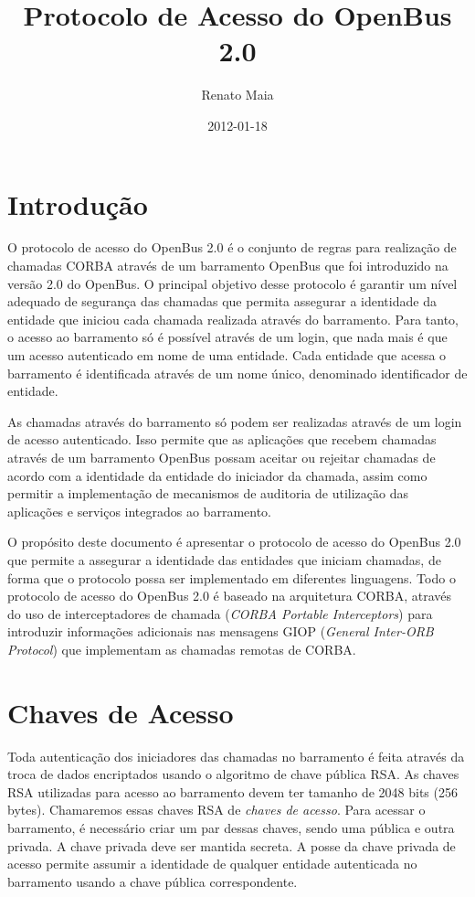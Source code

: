 \documentclass[]{article}
\title{Protocolo de Acesso do OpenBus 2.0}
\author{Renato Maia}
\date{2012-01-18}
\newcommand{\term}[1]{\textit{#1}}
\begin{document}
\ifpdf
{}
\else
{}
\fi

\maketitle


\section{Introdução}

O protocolo de acesso do OpenBus 2.0 é o conjunto de regras para realização de chamadas CORBA através de um barramento OpenBus que foi introduzido na versão 2.0 do OpenBus.
O principal objetivo desse protocolo é garantir um nível adequado de segurança das chamadas que permita assegurar a identidade da entidade que iniciou cada chamada realizada através do barramento.
Para tanto, o acesso ao barramento só é possível através de um login, que nada mais é que um acesso autenticado em nome de uma entidade.
Cada entidade que acessa o barramento é identificada através de um nome único, denominado identificador de entidade.

As chamadas através do barramento só podem ser realizadas através de um login de acesso autenticado.
Isso permite que as aplicações que recebem chamadas através de um barramento OpenBus possam aceitar ou rejeitar chamadas de acordo com a identidade da entidade do iniciador da chamada, assim como permitir a implementação de mecanismos de auditoria de utilização das aplicações e serviços integrados ao barramento.

O propósito deste documento é apresentar o protocolo de acesso do OpenBus 2.0 que permite a assegurar a identidade das entidades que iniciam chamadas, de forma que o protocolo possa ser implementado em diferentes linguagens.
Todo o protocolo de acesso do OpenBus 2.0 é baseado na arquitetura CORBA, através do uso de interceptadores de chamada (\term{CORBA Portable Interceptors}) para introduzir informações adicionais nas mensagens GIOP (\term{General Inter-ORB Protocol}) que implementam as chamadas remotas de CORBA.

\section{Chaves de Acesso} %
\label{sec:chaves_de_acesso}

Toda autenticação dos iniciadores das chamadas no barramento é feita através da troca de dados encriptados usando o algoritmo de chave pública RSA.
As chaves RSA utilizadas para acesso ao barramento devem ter tamanho de 2048 bits (256 bytes).
Chamaremos essas chaves RSA de \term{chaves de acesso}.
Para acessar o barramento, é necessário criar um par dessas chaves, sendo uma pública e outra privada.
A chave privada deve ser mantida secreta.
A posse da chave privada de acesso permite assumir a identidade de qualquer entidade autenticada no barramento usando a chave pública correspondente.
\end{document}
